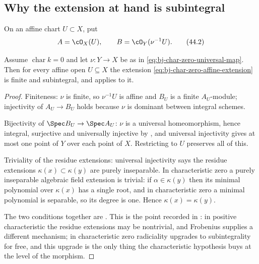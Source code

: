 \subsection{Why the extension at hand is subintegral}
\label{sec:ch44-why-subintegral}

On an affine chart $U\subset X$, put
\[
                         A=\cO_X(U),
             \qquad
                         B=\cO_Y(\nu^{-1}U).
\tag{44.2}\label{eq:bj-char-zero-affine-extension}
\]
\begin{lemma}
\label{lem:ch44-char-zero-subintegral}
Assume $\operatorname{char}k=0$ and let $\nu:Y\to X$ be as in
\eqref{eq:bj-char-zero-universal-map}.  Then for every affine open
$U\subseteq X$ the extension \eqref{eq:bj-char-zero-affine-extension} is
finite and subintegral, and  applies
to it.
\end{lemma}

\begin{proof}
Finiteness: $\nu$ is finite, so $\nu^{-1}U$ is affine and $B_U$ is a
finite $A_U$-module; injectivity of $A_U\to B_U$ holds because $\nu$
is dominant between integral schemes.

Bijectivity of $\Spec B_U\to\Spec A_U$: $\nu$ is a universal
homeomorphism, hence integral, surjective and universally injective by
, and universal
injectivity gives at most one point of $Y$ over each point of $X$.
Restricting to $U$ preserves all of this.

Triviality of the residue extensions: universal injectivity says the residue
extensions $\kappa(x)\subset\kappa(y)$ are purely inseparable.  In
characteristic zero a purely inseparable algebraic field extension is
trivial: if $\alpha\in\kappa(y)$ then its minimal polynomial over
$\kappa(x)$ has a single root, and in characteristic zero a minimal
polynomial is separable, so its degree is one.  Hence
$\kappa(x)=\kappa(y)$.

The two conditions together are .
This is the point recorded in : in
positive characteristic the residue extensions may be nontrivial, and
Frobenius supplies a different mechanism; in characteristic zero
radiciality upgrades to subintegrality for free, and this upgrade is the
only thing the characteristic hypothesis buys at the level of the morphism.
\end{proof}


